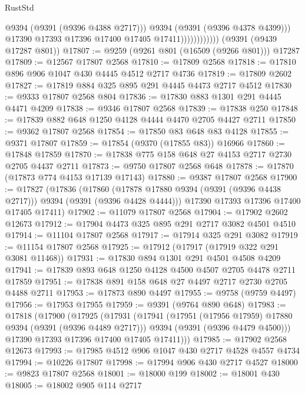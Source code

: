 \begin{lexlean}{RustStd}
\begin{coremodule}
                                @9394
                                (@9391 (@9396 @4388 @2717)))
                              @9394
                              (@9391 (@9396 @4378 @4399)))
                            @17390
                            @17393
                            @17396
                            @17400
                            @17405
                            @17411))))))))))))
    (@9391 (@9439 @17287 @801))
@17807 := @9259 (@9261 @801 (@16509 (@9266 @801))) @17287
@17809 := @12567 @17807 @2568
@17810 := @17809 @2568
@17818 := @17810 @896 @906 @1047 @430 @4445 @4512 @2717 @4736
@17819 := @17809 @2602
@17827 := @17819 @884 @325 @895 @291 @4445 @4473 @2717 @4512
@17830 := @9333 @17807 @2568 @804
@17836 := @17830 @883 @1301 @291 @4445 @4471 @4209
@17838 := @9346 @17807 @2568
@17839 := @17838 @250
@17848 := @17839 @882 @648 @1250 @4128 @4444 @4470 @2705 @4427 @2711
@17850 := @9362 @17807 @2568
@17854 := @17850 @83 @648 @83 @4128
@17855 := @9371 @17807
@17859 := @17854 (@9370 (@17855 @83)) @16966
@17860 := @17848 @17859
@17870 := @17838 @775 @158 @648 @27 @4153 @2717 @2730 @2705 @4437 @2711
@17873 := @9750 @17807 @2568 @648
@17878 := @17870 (@17873 @774 @4153 @17139 @17143)
@17880 := @9387 @17807 @2568
@17900 := @17827
    (@17836
      (@17860 (@17878 @17880 @9394 (@9391 (@9396 @4438 @2717))) @9394 (@9391 (@9396 @4428 @4444)))
      @17390
      @17393
      @17396
      @17400
      @17405
      @17411)
@17902 := @11079 @17807 @2568
@17904 := @17902 @2602 @12673
@17912 := @17904 @4473 @325 @895 @291 @2717 @3082 @4501 @4510
@17914 := @11104 @17807 @2568
@17917 := @17914 @325 @291 @3082
@17919 := @11154 @17807 @2568
@17925 := @17912 (@17917 (@17919 @322 @291 @3081 @11468))
@17931 := @17830 @894 @1301 @291 @4501 @4508 @4209
@17941 := @17839 @893 @648 @1250 @4128 @4500 @4507 @2705 @4478 @2711 @17859
@17951 := @17838 @891 @158 @648 @27 @4497 @2717 @2730 @2705 @4488 @2711
@17953 := @17873 @890 @4497
@17955 := @9758 (@9759 @4497)
@17956 := @17953 @17955
@17959 := @9391 (@9764 @890 @648)
@17983 := @17818
    (@17900
      (@17925
        (@17931
          (@17941
            (@17951 (@17956 @17959) @17880 @9394 (@9391 (@9396 @4489 @2717)))
            @9394
            (@9391 (@9396 @4479 @4500)))
          @17390
          @17393
          @17396
          @17400
          @17405
          @17411)))
@17985 := @17902 @2568 @12673
@17993 := @17985 @4512 @906 @1047 @430 @2717 @4528 @4557 @4734
@17994 := @10226 @17807
@17998 := @17994 @906 @430 @2717 @4527
@18000 := @9823 @17807 @2568
@18001 := @18000 @199
@18002 := @18001 @430
@18005 := @18002 @905 @114 @2717

\end{coremodule}
\end{lexlean}
